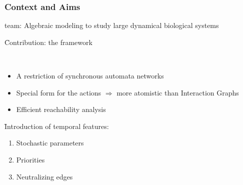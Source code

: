 
\begin{frame}[c]
  \frametitle{Context and Aims}

 team: Algebraic modeling to study large dynamical biological systems

\bigskip
\f Contribution: the  framework

{\small\tcite{\cpmrtcsb}\\
\tcite{\cpmrmscs}}

\begin{itemize}
  \item A restriction of synchronous automata networks
  \item Special form for the actions $\Rightarrow$ more atomistic than Interaction Graphs
  \item Efficient reachability analysis
\end{itemize}


\bigskip
\f Introduction of temporal features:

\begin{enumerate}[1)]
  \item Stochastic parameters\\
{\small\tcite{\cpmrtcsb}}
  \item Priorities\\
{\small\tcite{\cfpmrcsbio}}
  \item Neutralizing edges
\end{enumerate}

\end{frame}
